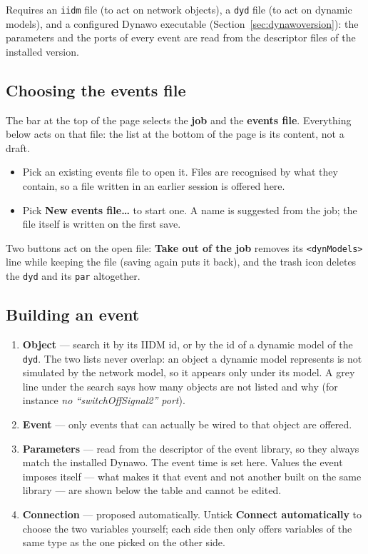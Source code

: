 \documentclass[a4paper,11pt]{article}
\newcommand{\code}[1]{\texttt{\small #1}}
\newcommand{\ftype}[1]{\texttt{\small\color{rteblu}#1}}
\begin{document}
Requires an \ftype{iidm} file (to act on network objects), a \ftype{dyd} file
(to act on dynamic models), and a configured Dynawo executable
(Section~\ref{sec:dynawoversion}): the parameters and the ports of every event
are read from the descriptor files of the installed version.

\subsection{Choosing the events file}

The bar at the top of the page selects the \textbf{job} and the \textbf{events
file}. Everything below acts on that file: the list at the bottom of the page
is its content, not a draft.

\begin{itemize}[leftmargin=2em]
  \item Pick an existing events file to open it. Files are recognised by what
    they contain, so a file written in an earlier session is offered here.
  \item Pick \textbf{New events file\ldots} to start one. A name is suggested
    from the job; the file itself is written on the first save.
\end{itemize}

Two buttons act on the open file: \textbf{Take out of the job} removes its
\code{<dynModels>} line while keeping the file (saving again puts it back), and
the trash icon deletes the \ftype{dyd} and its \ftype{par} altogether.

\subsection{Building an event}

\begin{enumerate}[leftmargin=2em]
  \item \textbf{Object} --- search it by its IIDM id, or by the id of a dynamic
    model of the \ftype{dyd}. The two lists never overlap: an object a dynamic
    model represents is not simulated by the network model, so it appears only
    under its model. A grey line under the search says how many objects are not
    listed and why (for instance \emph{no ``switchOffSignal2'' port}).
  \item \textbf{Event} --- only events that can actually be wired to that
    object are offered.
  \item \textbf{Parameters} --- read from the descriptor of the event library,
    so they always match the installed Dynawo. The event time is set here.
    Values the event imposes itself --- what makes it that event and not
    another built on the same library --- are shown below the table and cannot
    be edited.
  \item \textbf{Connection} --- proposed automatically. Untick \textbf{Connect
    automatically} to choose the two variables yourself; each side then only
    offers variables of the same type as the one picked on the other side.
\end{enumerate}
\end{document}
